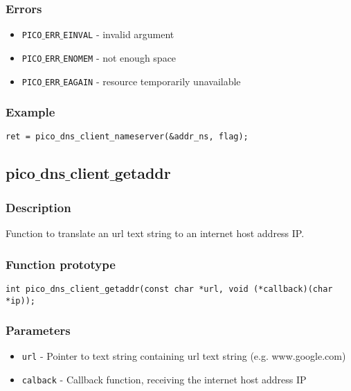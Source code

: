\subsubsection*{Errors}
\begin{itemize}[noitemsep]
\item \texttt{PICO$\_$ERR$\_$EINVAL} - invalid argument
\item \texttt{PICO$\_$ERR$\_$ENOMEM} - not enough space
\item \texttt{PICO$\_$ERR$\_$EAGAIN} - resource temporarily unavailable
\end{itemize}

\subsubsection*{Example}
\begin{verbatim}
ret = pico_dns_client_nameserver(&addr_ns, flag);
\end{verbatim}



\subsection{pico$\_$dns$\_$client$\_$getaddr}

\subsubsection*{Description}
Function to translate an url text string to an internet host address IP. 

\subsubsection*{Function prototype}
\begin{verbatim}
int pico_dns_client_getaddr(const char *url, void (*callback)(char *ip));
\end{verbatim}

\subsubsection*{Parameters}
\begin{itemize}[noitemsep]
\item \texttt{url} - Pointer to text string containing url text string (e.g. www.google.com)
\item \texttt{calback} - Callback function, receiving the internet host address IP
\end{itemize}

